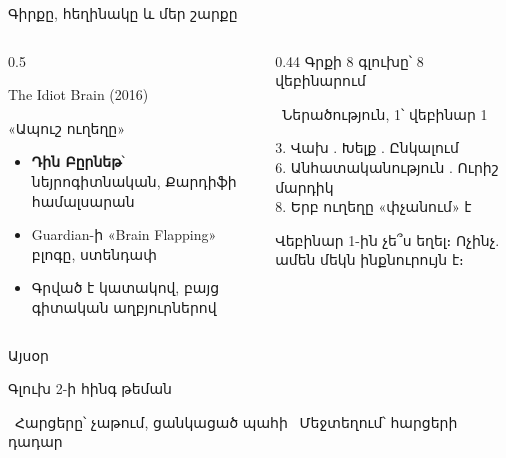 \begin{frame}{Գիրքը, հեղինակը և մեր շարքը}
  \begin{columns}[T]
    \begin{column}{0.5\textwidth}
      \begin{card}
        {\blackfont\Large The Idiot Brain} {\small (2016)}\par
        «Ապուշ ուղեղը»\par\medskip
        \begin{itemize}
          \item \textbf{Դին Բըրնեթ}՝ նեյրոգիտնական, Քարդիֆի համալսարան
          \item Guardian-ի «Brain Flapping» բլոգը, ստենդափ
          \item Գրված է կատակով, բայց գիտական աղբյուրներով
        \end{itemize}
        \vspace{-1mm}
      \end{card}
    \end{column}
    \begin{column}{0.44\textwidth}
      {\blackfont\small Գրքի 8 գլուխը՝ 8 վեբինարում}\par\smallskip
      {\color{plum!55!cream}\small {}\ Ներածություն, 1՝ վեբինար 1}\par\smallskip
      \par\smallskip
      {\color{plum!55!cream}\small
      3. Վախ . Խելք . Ընկալում\\
      6. Անհատականություն . Ուրիշ մարդիկ\\
      8. Երբ ուղեղը «փչանում» է}\par\smallskip
      \begin{card}[colback=mint!35!cardwhite]
        Վեբինար 1-ին չե՞ս եղել։ Ոչինչ. ամեն մեկն ինքնուրույն է։
      \end{card}
    \end{column}
  \end{columns}
\end{frame}

\begin{frame}{Այսօր}
  \centering
  \begin{card}[width=0.62\textwidth, colback=lavender!45!cream]
    {\blackfont Գլուխ 2-ի հինգ թեման}\par\medskip
    \par\smallskip
    \par\smallskip
    \par\smallskip
    \par\smallskip
  \end{card}
  \vspace{2mm}
  {\small {}\ Հարցերը՝ չաթում, ցանկացած պահի \quad {}\ Մեջտեղում՝ հարցերի դադար}
\end{frame}
